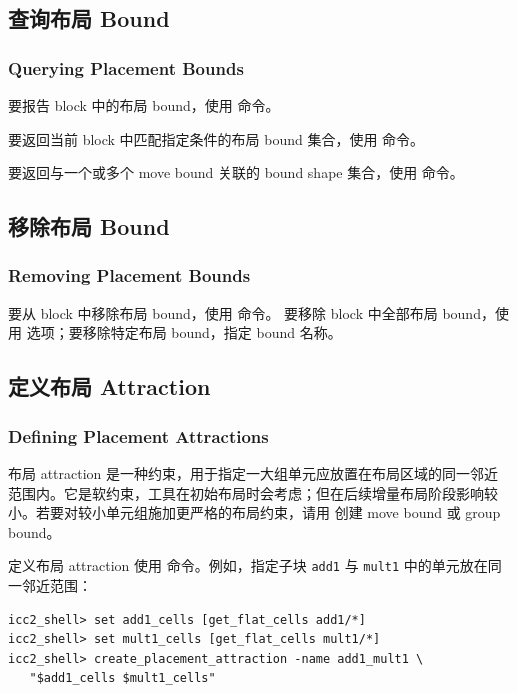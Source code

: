 \subsection{查询布局 Bound}
\subsubsection*{Querying Placement Bounds}

要报告 block 中的布局 bound，使用  命令。

要返回当前 block 中匹配指定条件的布局 bound 集合，使用  命令。

要返回与一个或多个 move bound 关联的 bound shape 集合，使用  命令。

\subsection{移除布局 Bound}
\subsubsection*{Removing Placement Bounds}

要从 block 中移除布局 bound，使用  命令。
要移除 block 中全部布局 bound，使用  选项；要移除特定布局 bound，指定 bound 名称。

\subsection{定义布局 Attraction}
\subsubsection*{Defining Placement Attractions}

布局 attraction 是一种约束，用于指定一大组单元应放置在布局区域的同一邻近范围内。它是软约束，工具在初始布局时会考虑；但在后续增量布局阶段影响较小。若要对较小单元组施加更严格的布局约束，请用  创建 move bound 或 group bound。

定义布局 attraction 使用  命令。例如，指定子块 \texttt{add1} 与 \texttt{mult1} 中的单元放在同一邻近范围：
\begin{lstlisting}
icc2_shell> set add1_cells [get_flat_cells add1/*]
icc2_shell> set mult1_cells [get_flat_cells mult1/*]
icc2_shell> create_placement_attraction -name add1_mult1 \
   "$add1_cells $mult1_cells"
\end{lstlisting}

